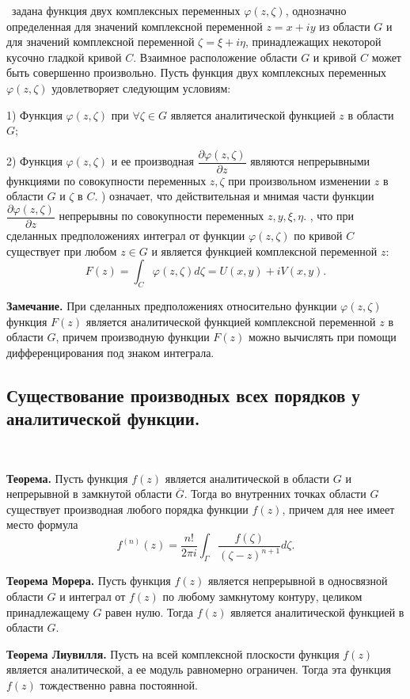 \documentclass[9pt]{article}
\begin{document}
\ 
 задана функция двух комплексных переменных \(\varphi(z,\zeta)\), однозначно определенная для значений комплексной переменной \(z=x+iy\) из области \(G\) и для значений комплексной переменной \(\zeta=\xi+i\eta\), принадлежащих некоторой кусочно гладкой кривой \(C\). Взаимное расположение области \(G\) и кривой \(C\) может быть совершенно произвольно. Пусть функция двух комплексных переменных \(\varphi(z,\zeta)\) удовлетворяет следующим условиям:
\par1) Функция \(\varphi(z,\zeta)\) при \(\forall \zeta\in G\) является аналитической функцией \(z\) в области \(G\);
\par2) Функция \(\varphi(z,\zeta)\) и ее производная \(\dfrac{\partial\varphi(z,\zeta)}{\partial z}\) являются непрерывными функциями по совокупности переменных \(z,\zeta\) при произвольном изменении \(z\) в области \(G\) и \(\zeta\) в \(C\).
\parУсловие 2) означает, что действительная и мнимая части функции \(\dfrac{\partial\varphi(z,\zeta)}{\partial z}\) непрерывны по совокупности переменных \(z,y,\xi,\eta\).
\parОчевидно, что при сделанных предположениях интеграл от функции \(\varphi(z,\zeta)\) по кривой \(C\) существует при любом \(z\in G\) и является функцией комплексной переменной \(z\):
\[F(z)=\int_C\varphi(z,\zeta)d\zeta=U(x,y)+iV(x,y).\]
\par\textbf{Замечание.} При сделанных предположениях относительно функции \(\varphi(z,\zeta)\) функция \(F(z)\) является аналитической функцией комплексной переменной \(z\) в области \(G\), причем производную функции \(F(z)\) можно вычислять при помощи дифференцирования под знаком интеграла.

\subsection{Существование производных всех порядков у аналитической функции.}

\ 
\par\textbf{Теорема.} Пусть функция \(f(z)\) является аналитической в области \(G\) и непрерывной в замкнутой области \(\overline{G}\). Тогда во внутренних точках области \(G\) существует производная любого порядка функции \(f(z)\), причем для нее имеет место формула
\begin{equation}
    f^{(n)}(z)=\dfrac{n!}{2\pi i}\int_\Gamma\dfrac{f(\zeta)}{(\zeta-z)^{n+1}}d\zeta.
\end{equation}
\par\textbf{Теорема Морера.} Пусть функция \(f(z)\) является непрерывной в односвязной области \(G\) и интеграл от \(f(z)\) по любому замкнутому контуру, целиком принадлежащему \(G\) равен нулю. Тогда \(f(z)\) является аналитической функцией в области \(G\).
\par\textbf{Теорема Лиувилля.} Пусть на всей комплексной плоскости функция \(f(z)\) является аналитической, а ее модуль равномерно ограничен. Тогда эта функция \(f(z)\) тождественно равна постоянной.
\end{document}
